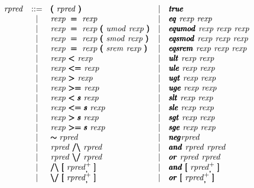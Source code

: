 \documentclass{article}
\begin{document}
\[
\begin{array}{rclcl}
  \rpred &  ::= & \pmb{(}\ \rpred\ \pmb{)}
  & \mid & \pmb\true \\
         & \mid & \rexp\ \pmb\eqop\ \rexp
  & \mid & \pmb\ieq\ \rexp\ \rexp \\
         & \mid & \rexp\ \pmb\eqop\ \rexp\ \pmb(\ \iumod\ \rexp\ \pmb)
  & \mid & \pmb\iequmod\ \rexp\ \rexp\ \rexp \\
         & \mid & \rexp\ \pmb\eqop\ \rexp\ \pmb(\ \ismod\ \rexp\ \pmb)
  & \mid & \pmb\ieqsmod\ \rexp\ \rexp\ \rexp \\
         & \mid & \rexp\ \pmb\eqop\ \rexp\ \pmb(\ \isrem\ \rexp\ \pmb)
  & \mid & \pmb\ieqsrem\ \rexp\ \rexp\ \rexp \\
         & \mid & \rexp\ \pmb\ultop\ \rexp
  & \mid & \pmb\iult\ \rexp\ \rexp \\
         & \mid & \rexp\ \pmb\uleop\ \rexp
  & \mid & \pmb\iule\ \rexp\ \rexp \\
         & \mid & \rexp\ \pmb\ugtop\ \rexp
  & \mid & \pmb\iugt\ \rexp\ \rexp \\
         & \mid & \rexp\ \pmb\ugeop\ \rexp
  & \mid & \pmb\iuge\ \rexp\ \rexp \\
         & \mid & \rexp\ \pmb\sltop\ \rexp
  & \mid & \pmb\islt\ \rexp\ \rexp \\
         & \mid & \rexp\ \pmb\sleop\ \rexp
  & \mid & \pmb\isle\ \rexp\ \rexp \\
         & \mid & \rexp\ \pmb\sgtop\ \rexp
  & \mid & \pmb\isgt\ \rexp\ \rexp \\
         & \mid & \rexp\ \pmb\sgeop\ \rexp
  & \mid & \pmb\isge\ \rexp\ \rexp \\
         & \mid & \pmb\negop \rpred
  & \mid & \pmb\ineg \rpred \\
         & \mid & \rpred\ \pmb{\landop}\ \rpred
  & \mid & \pmb{\iand}\ \rpred\ \rpred \\
         & \mid & \rpred\ \pmb{\lorop}\ \rpred
  & \mid & \pmb{\ior}\ \rpred\ \rpred \\
         & \mid & \pmb{\landop}\ \pmb{[}\ \rpred_{\pmb,}^+\ \pmb{]}
  & \mid & \pmb{\iand}\ \pmb{[}\ \rpred_{\pmb,}^+\ \pmb{]} \\
         & \mid & \pmb{\lorop}\ \pmb{[}\ \rpred_{\pmb,}^+\ \pmb{]}
  & \mid & \pmb{\ior}\ \pmb{[}\ \rpred_{\pmb,}^+\ \pmb{]}
\end{array}
\]
\end{document}
